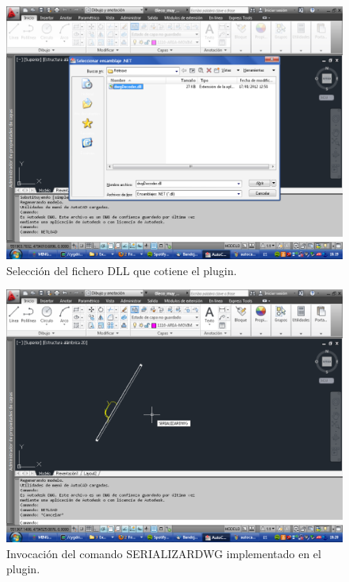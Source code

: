 \begin{figure}[h]
\begin{center}
\includegraphics[width=\textwidth]{imgs/autocad4}
\caption{Selección del fichero DLL que cotiene el plugin.}
\end{center}
\end{figure}

\begin{figure}[h]
\begin{center}
\includegraphics[width=\textwidth]{imgs/autocad5}
\caption{Invocación del comando SERIALIZARDWG implementado en el plugin.}
\end{center}
\end{figure}

